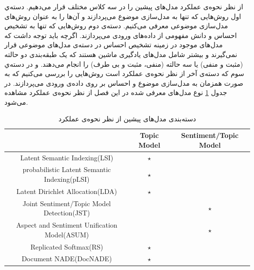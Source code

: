 از نظر نحوه‌ی عملکرد مدل‌های پیشین را در سه‌  کلاس مختلف قرار می‌‌دهیم. دسته‌ي اول روش‌هایی که تنها به مدل‌سازی موضوع می‌‌پردازند و آن‌ها را به عنوان روش‌های مدل‌سازی موضوعی معرفی‌ می‌‌کنیم. دسته‌ی دوم روش‌هایی که تنها به تشخیص احساس و دانش مفهومی‌ از داده‌های ورودی می‌‌پردازند. اگرچه باید توجه داشت که مدل‌های موجود در زمینه تشخیص احساس در دسته‌ی مدل‌های موضوعی قرار نمی‌‌گیرند و بیشتر شامل مدل‌های یادگیری ماشین هستند که یک طبقه‌بندی
 دو حالته (مثبت و منفی‌) یا سه‌ حالته (منفی‌، مثبت و بی‌ طرف) را انجام می‌‌دهند. 
و در دسته‌‌ي سوم که دسته‌ی آخر از نظر نحوه‌ی عملکرد است روش‌هایی را بررسی می‌کنیم که به صورت همزمان به مدل‌سازی موضوع و احساس بر روی داده‌ی ورودی می‌‌پردازند.  در جدول
\ref{tabel3-2}
نوع مدل‌های معرفی‌ شده در این فصل از نظر نحو‌ه‌ی عملکرد مشاهده می‌‌شود.
\begin{table}[!h]
	\centering
	\begin{latin}
		\begin{tabular}{|c|c|c|}
			\hline
			                         & Topic Model & Sentiment/Topic Model \\ \hline
			       Latent Semantic Indexing(LSI)         &   $\star$   &  \\ \hline
			probabilistic Latent Semantic Indexing(pLSI) &   $\star$   &  \\ \hline
			      Latent Dirichlet Allocation(LDA)       &   $\star$   &  \\ \hline
			 Joint Sentiment/Topic Model Detection(JST)  &             &        $\star$        \\ \hline
			Aspect and Sentiment Unification Model(ASUM) &             &        $\star$        \\ \hline
			           Replicated Softmax(RS)            &   $\star$   &  \\ \hline
			           Document NADE(DocNADE)            &   $\star$   &  \\ \hline
		\end{tabular}
	\end{latin}
	\caption{دسته‌بندی مدل‌های پیشین از نظر نحوه‌ی عملکرد}
	\label{tabel3-2}
\end{table}



